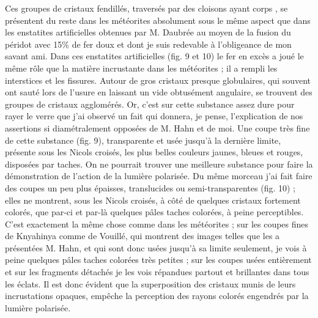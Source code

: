 \documentclass[a4paper, 12pt, oneside, french]{article}
\begin{document}
Ces groupes de cristaux fendillés, traversés par des \og cloisons ayant corps \fg, se présentent du reste dans les météorites absolument sous le même aspect que dans les enstatites artificielles obtenues par M. Daubrée au moyen de la fusion du péridot avec 15\% de fer doux et dont je suis redevable à l'obligeance de mon savant ami. Dans ces enstatites artificielles (fig. 9 et 10) le fer en excès a joué le même rôle que la matière incrustante dans les météorites ; il a rempli les interstices et les fissures. Autour de gros cristaux presque globulaires, qui souvent ont sauté lors de l'usure en laissant un vide obtusément angulaire, se trouvent des groupes de cristaux agglomérés. Or, c'est sur cette substance assez dure pour rayer le verre que j'ai observé un fait qui donnera, je pense, l'explication de nos assertions si diamétralement opposées de M. Hahn et de moi. Une coupe très fine de cette substance (fig. 9), transparente et usée jusqu'à la dernière limite, présente sous les Nicols croisés, les plus belles couleurs jaunes, bleues et rouges, disposées par taches. On ne pourrait trouver une meilleure substance pour faire la démonstration de l'action de la lumière polarisée. Du même morceau j'ai fait faire des coupes un peu plus épaisses, translucides ou semi-transparentes (fig. 10) ; elles ne montrent, sous les Nicols croisés, à côté de quelques cristaux fortement colorés, que par-ci et par-là quelques pâles taches colorées, à peine perceptibles. C'est exactement la même chose comme dans les météorites ; sur les coupes fines de Knyahinya comme de Vouillé, qui montrent des images telles que les a présentées M. Hahn, et qui sont donc usées jusqu'à sa limite seulement, je vois à peine quelques pâles taches colorées très petites ; sur les coupes usées entièrement et sur les fragments détachés je les vois répandues partout et brillantes dans tous les éclats. Il est donc évident que la superposition des cristaux munis de leurs incrustations opaques, empêche la perception des rayons colorés engendrés par la lumière polarisée.
\end{document}
